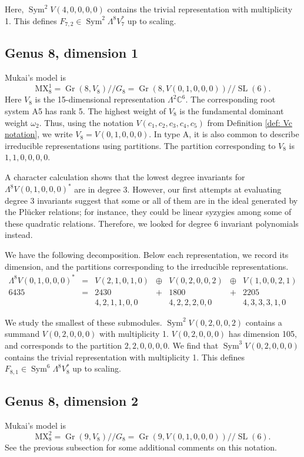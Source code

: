 \documentclass{amsart}[12pt]
\theoremstyle{definition}
\numberwithin{equation}{section}
\newcommand{\Sym}{\operatorname{Sym}}
\newcommand{\SL}{\operatorname{SL}}
\newcommand{\Gr}{\operatorname{Gr}}
\newcommand{\git}{/\!\!/}
\newcommand{\mywedge}{\mathsf{\Lambda}}
\newcommand{\mukai}{\mathrm{MX}}
\newcommand{\LieG}{G}
\begin{document}
Here, $\Sym^2 V(4,0,0,0,0)$ contains the trivial representation with
multiplicity 1. This defines $F_{7,2} \in
\Sym^2 \mywedge^8 V_7^{*}$ up to scaling. 

\subsection{Genus 8, dimension 1}
Mukai's model is
\[
\mukai^{1}_8=  \Gr(8,V_8) \git \LieG_8 = \Gr(8,V(0,1,0,0,0)) \git \SL(6).
\]
Here $V_8$ is the 15-dimensional representation $\mywedge^2
\mathbb{C}^6$. The corresponding root system A5 has rank 5. The highest
weight of $V_8$ is the fundamental dominant weight
$\omega_2$. Thus, using the notation $V(c_1,c_2,c_3,c_4,c_5)$ from
Definition \ref{def: Vc notation}, we write $V_8 = V(0,1,0,0,0)$.  In
type A, it is also common to describe irreducible representations
using partitions. The partition corresponding to $V_8$ is $1,1,0,0,0,0$.

A character calculation shows that the lowest degree invariants for $\mywedge^8 V(0,1,0,0,0)^{*}$ are in
degree 3. However, our first attempts at evaluating degree 3 invariants
suggest that some or all of them are in the ideal generated by the Pl\"{u}cker
relations; for instance, they could be linear syzygies among some of these
quadratic relations. Therefore, we looked for degree 6 invariant
polynomials instead. 

We have the following decomposition. Below each representation, we
record its dimension, and the partitions corresponding to the
irreducible representations.
\[
\begin{array}{ccccccc}
  \mywedge^8 V(0,1,0,0,0)^{*} & = & V(2,1,0,1,0) & \oplus & V(0,2,0,0,2)& \oplus & V(1,0,0,2,1)
  \\
  6435 & = & 2430 &+ & 1800 &+ & 2205 \\
           &     & 4,2,1,1,0,0 & &4,2,2,2,0,0 & &4,3,3,3,1,0
\end{array}
\]


We study the smallest of these submodules. $\Sym^2  V(0,2,0,0,2)$
contains a summand $V(0,2,0,0,0) $ with multiplicity 1. $V(0,2,0,0,0)$
has dimension 105, and corresponds to the partition $2,2,0,0,0,0$. We
find that $\Sym^3 V(0,2,0,0,0)$ contains the trivial representation with multiplicity 1. This defines $F_{8,1} \in
\Sym^6 \mywedge^8 V_8^{*}$ up to scaling. 


\subsection{Genus 8, dimension 2} \label{subsec: genus 8 dim 2}
Mukai's model is
\[
\mukai^{2}_8 =  \Gr(9,V_8) \git \LieG_8 = \Gr(9,V(0,1,0,0,0)) \git \SL(6).
\]
See the previous subsection for some additional comments on this
notation.
\end{document}
